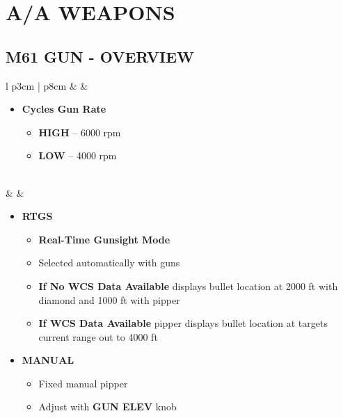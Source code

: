 \documentclass[8pt,usenames,dvipsnames,twoside]{article}
\begin{document}
	\cleardoublepage

	\section{A/A WEAPONS}

	\subsection{M61 GUN - OVERVIEW}
	\begin{center}
		\begin{longtable}{l p{3cm} | p{8cm}}
			\toprule
			\textbullet &  \hfill\null {} &
			\begin{minipage}[t]{\linewidth}
				\vspace{-7pt}
				\begin{itemize}
					\item \textbf{Cycles Gun Rate}
					\begin{itemize}
						\item \textbf{HIGH} -- 6000 rpm
						\item \textbf{LOW} -- 4000 rpm
					\end{itemize}
				\end{itemize}
			\end{minipage} \\
			\midrule
			\textbullet &  &
			\begin{minipage}[t]{\linewidth}
				\vspace{-7pt}
				\begin{itemize}
					\item \textbf{RTGS}
					\begin{itemize}
						\item \textbf{Real-Time Gunsight Mode}
						\item Selected automatically with guns
						\item \textbf{If No WCS Data Available} displays bullet location at 2000 ft with diamond and 1000 ft with pipper
						\item \textbf{If WCS Data Available} pipper displays bullet location at targets current range out to 4000 ft
					\end{itemize}
					\item \textbf{MANUAL}
					\begin{itemize}
						\item Fixed manual pipper
						\item Adjust with \textbf{GUN ELEV} knob

\end{itemize}
\end{itemize}
\end{minipage}
\end{longtable}
\end{center}
\end{document}
